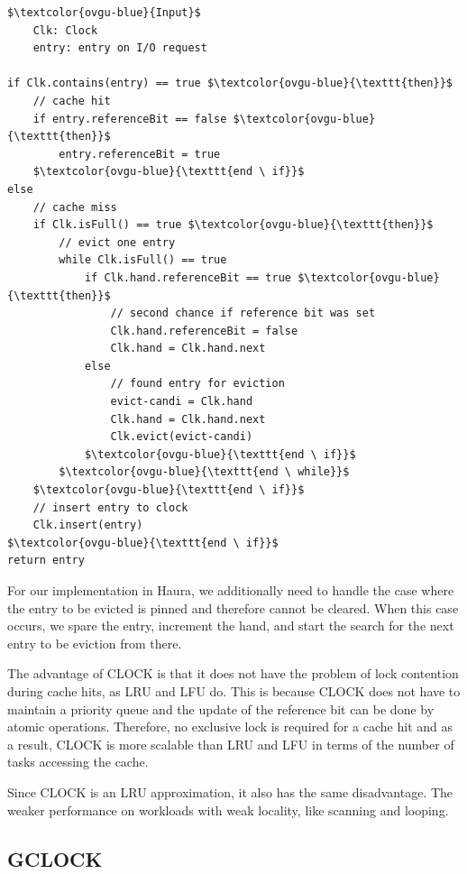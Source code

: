 \documentclass[
	12pt,
	a4paper,
	abstract,
	bibliography=totoc,
	chapterprefix,
	headings=openright,
	numbers=endperiod,
	parskip=half,
	twoside,
]{scrreprt}
\begin{document}
\begin{lstlisting}[mathescape=true,caption=CLOCK replacement algorithm in pseudocode,label=lst:clock-algorithm]
$\textcolor{ovgu-blue}{Input}$
	Clk: Clock
	entry: entry on I/O request

if Clk.contains(entry) == true $\textcolor{ovgu-blue}{\texttt{then}}$
	// cache hit
	if entry.referenceBit == false $\textcolor{ovgu-blue}{\texttt{then}}$
		entry.referenceBit = true
	$\textcolor{ovgu-blue}{\texttt{end \ if}}$
else
	// cache miss
	if Clk.isFull() == true $\textcolor{ovgu-blue}{\texttt{then}}$
		// evict one entry
		while Clk.isFull() == true
			if Clk.hand.referenceBit == true $\textcolor{ovgu-blue}{\texttt{then}}$
				// second chance if reference bit was set
				Clk.hand.referenceBit = false
				Clk.hand = Clk.hand.next
			else
				// found entry for eviction 
				evict-candi = Clk.hand
				Clk.hand = Clk.hand.next
				Clk.evict(evict-candi)
			$\textcolor{ovgu-blue}{\texttt{end \ if}}$
		$\textcolor{ovgu-blue}{\texttt{end \ while}}$
	$\textcolor{ovgu-blue}{\texttt{end \ if}}$
	// insert entry to clock
	Clk.insert(entry)
$\textcolor{ovgu-blue}{\texttt{end \ if}}$	
return entry 
\end{lstlisting}

For our implementation in Haura, we additionally need to handle the case where the entry to be evicted is pinned and therefore cannot be cleared.
When this case occurs, we spare the entry, increment the hand, and start the search for the next entry to be eviction from there.

The advantage of CLOCK is that it does not have the problem of lock contention during cache hits, as LRU and LFU do.
This is because CLOCK does not have to maintain a priority queue and 
the update of the reference bit can be done by atomic operations. 
Therefore, no exclusive lock is required for a cache hit and 
as a result, CLOCK is more scalable than LRU and LFU in terms of 
the number of tasks accessing the cache.

Since CLOCK is an LRU approximation, it also has the same disadvantage.
The weaker performance on workloads with weak locality, like scanning and looping.

\subsection{GCLOCK}
\end{document}
